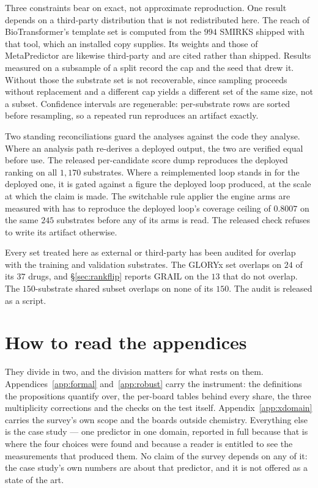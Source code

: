 \documentclass{article}
\newcommand{\ntest}{1{,}170}          %
\newcommand{\nshared}{150}            %
\begin{document}
Three constraints bear on exact, not approximate reproduction. One result depends on a
third-party distribution that is not redistributed here. The reach of BioTransformer's template set
is computed from the $994$ SMIRKS shipped with that tool, which an installed copy supplies. Its
weights and those of MetaPredictor are likewise third-party and are cited rather than shipped.
Results measured on a subsample of a split record the cap and the seed that drew it. Without those
the substrate set is not recoverable, since sampling proceeds without replacement and a different
cap yields a different set of the same size, not a subset. Confidence intervals are
regenerable: per-substrate rows are sorted before resampling, so a repeated run reproduces
an artifact exactly.

Two standing reconciliations guard the analyses against the code they analyse. Where an analysis
path re-derives a deployed output, the two are verified equal before use. The released
per-candidate score dump reproduces the deployed ranking on all $\ntest$ substrates. Where a
reimplemented loop stands in for the deployed one, it is gated against a figure the deployed loop
produced, at the scale at which the claim is made. The switchable rule applier the engine arms are
measured with has to reproduce the deployed loop's coverage ceiling of $0.8007$ on the same $245$
substrates before any of its arms is read. The released check refuses to write its artifact
otherwise.

Every set treated here as external or third-party has been audited for overlap with the training and
validation substrates. The GLORYx set overlaps on $24$ of its $37$ drugs, and \S\ref{sec:rankflip}
reports GRAIL on the $13$ that do not overlap. The $\nshared$-substrate shared subset overlaps on
none of its $150$. The audit is released as a script.




\appendix

\section*{How to read the appendices}

They divide in two, and the division matters for what rests on them. Appendices~\ref{app:formal}
and~\ref{app:robust} carry the instrument: the definitions the propositions quantify over, the
per-board tables behind every share, the three multiplicity corrections and the checks on the test
itself. Appendix~\ref{app:xdomain} carries the survey's own scope and the boards outside chemistry.
Everything else is the case study --- one predictor in one domain, reported in full because that is
where the four choices were found and because a reader is entitled to see the measurements that
produced them. No claim of the survey depends on any of it: the case study's own numbers are about
that predictor, and it is not offered as a state of the art.
\end{document}
